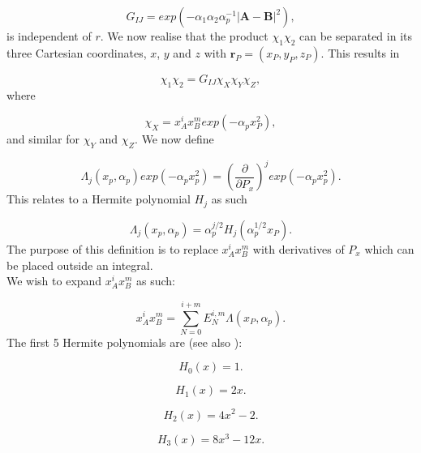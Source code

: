 \documentclass[a4paper,norsk,11pt,twoside]{report}
\begin{document}
\begin{equation}
G_{IJ} = exp(-\alpha_1 \alpha_2 \alpha_p^{-1} |\textbf{A} - \textbf{B}|^2)  ,
\end{equation}
is independent of $r$. We now realise that the product $\chi_1 \chi_2$ can be separated in its three Cartesian coordinates, $x$, $y$ and $z$ with $\textbf{r}_P = (x_P, y_P, z_P)$. This results in

\begin{equation}
\chi_1 \chi_2 = G_{IJ} \chi_X \chi_Y \chi_Z , \label{overlap}
\end{equation}
where

\begin{equation}
\chi_X = x_A^{i} x_B^m exp(-\alpha_p x_P^2) ,
\end{equation}
and similar for $\chi_Y$ and $\chi_Z$. We now define 

\begin{equation}
\Lambda_j (x_p, \alpha_p) exp(-\alpha_p x_p^2) = (\frac{\partial}{\partial P_x})^j exp(-\alpha_p x_p^2)  .
\end{equation}
This relates to a Hermite polynomial $H_j$ as such

\begin{equation}
\Lambda_j (x_p, \alpha_p) = \alpha_p^{j/2} H_j(\alpha_p^{1/2}x_P)  .
\end{equation}
The purpose of this definition is to replace $x_A^{i} x_B^m$ with derivatives of $P_x$ which can be placed outside an integral.\\

We wish to expand $x_A^{i} x_B^m$ as such:

\begin{equation}
x_A^i x_B^m = \sum_{N=0}^{i+m} E_N^{i,m} \Lambda(x_P, \alpha_p) . \label{recurslabel}
\end{equation}
The first 5 Hermite polynomials are (see also \cite{hermite_stuffies}):

\begin{equation}
H_0(x) = 1 . 
\end{equation}

\begin{equation}
H_1(x) = 2x . 
\end{equation}

\begin{equation}
H_2(x) = 4x^2 - 2 . 
\end{equation}

\begin{equation}
H_3(x) = 8x^3 - 12x . 
\end{equation}
\end{document}
